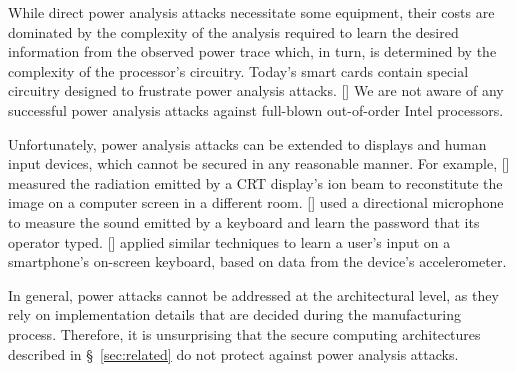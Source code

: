 While direct power analysis attacks necessitate some equipment, their costs are
dominated by the complexity of the analysis required to learn the desired
information from the observed power trace which, in turn, is determined by the
complexity of the processor's circuitry. Today's smart cards contain special
circuitry designed to frustrate power analysis attacks. [] We are not aware of
any successful power analysis attacks against full-blown out-of-order Intel
processors.

Unfortunately, power analysis attacks can be extended to displays and human
input devices, which cannot be secured in any reasonable manner. For example,
[] measured the radiation emitted by a CRT display's ion beam to reconstitute
the image on a computer screen in a different room. [] used a directional
microphone to measure the sound emitted by a keyboard and learn the password
that its operator typed. [] applied similar techniques to learn a user's input
on a smartphone's on-screen keyboard, based on data from the device's
accelerometer.

In general, power attacks cannot be addressed at the architectural level, as
they rely on implementation details that are decided during the manufacturing
process. Therefore, it is unsurprising that the secure computing architectures
described in \S~\ref{sec:related} do not protect against power analysis
attacks.
